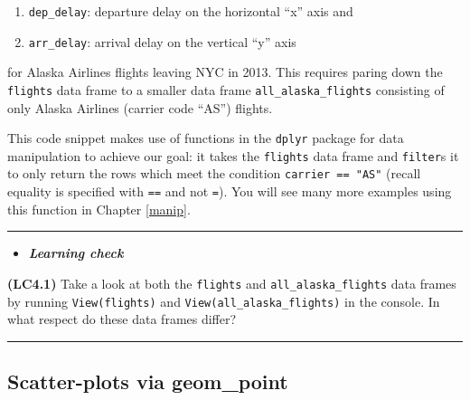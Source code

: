 \documentclass[]{tufte-book}
\newenvironment{Shaded}{\begin{snugshade}}{\end{snugshade}}
\newcommand{\KeywordTok}[1]{\textcolor[rgb]{0.13,0.29,0.53}{\textbf{{#1}}}}
\newcommand{\StringTok}[1]{\textcolor[rgb]{0.31,0.60,0.02}{{#1}}}
\newcommand{\NormalTok}[1]{{#1}}
\let\oldrule=\rule
\renewcommand{\rule}[1]{\oldrule{\linewidth}}
\providecommand{\tightlist}{%
  \setlength{\itemsep}{0pt}\setlength{\parskip}{0pt}}
\newenvironment{rmdblock}[1]
  {\begin{shaded*}
  \begin{itemize}
  \renewcommand{\labelitemi}{
    \raisebox{-.7\height}[0pt][0pt]{
    }
  }
  \item
  }
  {
  \end{itemize}
  \end{shaded*}
  }
\newenvironment{learncheck}
  {\begin{rmdblock}{warning}}
  {\end{rmdblock}}
\begin{document}
\begin{enumerate}
\def\labelenumi{\arabic{enumi}.}
\tightlist
\item
  \texttt{dep\_delay}: departure delay on the horizontal ``x'' axis and
\item
  \texttt{arr\_delay}: arrival delay on the vertical ``y'' axis
\end{enumerate}

for Alaska Airlines flights leaving NYC in 2013. This requires paring
down the \texttt{flights} data frame to a smaller data frame
\texttt{all\_alaska\_flights} consisting of only Alaska Airlines
(carrier code ``AS'') flights.

\begin{Shaded}
\end{Shaded}

This code snippet makes use of functions in the \texttt{dplyr} package
for data manipulation to achieve our goal: it takes the \texttt{flights}
data frame and \texttt{filter}s it to only return the rows which meet
the condition \texttt{carrier\ ==\ "AS"} (recall equality is specified
with \texttt{==} and not \texttt{=}). You will see many more examples
using this function in Chapter \ref{manip}.

\begin{center}\rule{0.5\linewidth}{\linethickness}\end{center}

\begin{learncheck}
\textbf{\emph{Learning check}}
\end{learncheck}

\textbf{(LC4.1)} Take a look at both the \texttt{flights} and
\texttt{all\_alaska\_flights} data frames by running
\texttt{View(flights)} and \texttt{View(all\_alaska\_flights)} in the
console. In what respect do these data frames differ?

\begin{center}\rule{0.5\linewidth}{\linethickness}\end{center}

\subsection{Scatter-plots via geom\_point}\label{geompoint}
\end{document}
